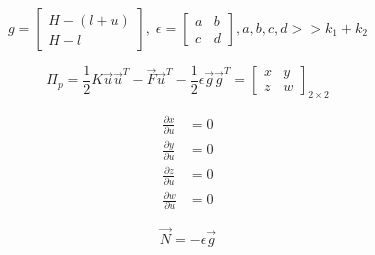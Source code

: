 \documentclass{article}
\begin{document}
\begin{equation}
    g = \begin{bmatrix}
        H-(l+u)\\
        H-l
    \end{bmatrix},\; \epsilon=\begin{bmatrix}
        a & b \\
        c & d
    \end{bmatrix}, a,b,c,d >> k_1+k_2
\end{equation}

\begin{equation}
    \Pi_p = \frac{1}{2}K\vec{u} \vec{u}^T - \vec{F} \vec{u}^T - \frac{1}{2}\epsilon \vec{g} \vec{g}^T = \begin{bmatrix}
        x & y\\
        z & w
    \end{bmatrix}_{2\times 2}
\end{equation}

\begin{align}
    \frac{\partial x}{\partial u} &= 0\\
    \frac{\partial y}{\partial u} &= 0\\
    \frac{\partial z}{\partial u} &= 0\\
    \frac{\partial w}{\partial u} &= 0
\end{align}

\begin{equation}
    \vec{N} = -\epsilon \vec{g}
\end{equation}
\end{document}
